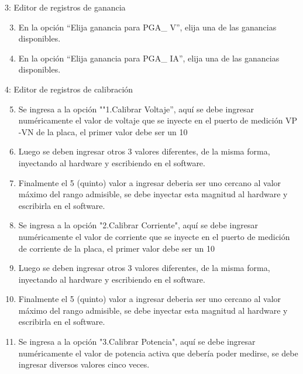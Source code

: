 3: Editor de registros de ganancia
\begin{enumerate}
\setcounter{enumi}{2}
\item En la opción \textquotedblleft Elija ganancia para PGA\_ V\textquotedblright , elija una de las ganancias disponibles.
\item En la opción \textquotedblleft Elija ganancia para PGA\_ IA\textquotedblright , elija una de las ganancias disponibles.
\end{enumerate}


4: Editor de registros de calibración
\begin{enumerate}
\setcounter{enumi}{4}
\item Se ingresa a la opción ""1.Calibrar Voltaje”, aquí se debe ingresar numéricamente el valor de voltaje que se inyecte en el puerto de medición VP -VN de la placa, el primer valor debe ser un 10%
\item Luego se deben ingresar otros 3 valores diferentes, de la misma forma, inyectando al hardware y escribiendo en el software.
\item Finalmente el 5 (quinto) valor a ingresar deberia ser uno cercano al valor máximo del rango admisible, se debe inyectar esta magnitud al hardware y escribirla en el software.
\item Se ingresa a la opción "2.Calibrar Corriente", aquí se debe ingresar numéricamente el valor de corriente que se inyecte en el puerto de medición de corriente de la placa, el primer valor debe ser un 10%
\item Luego se deben ingresar otros 3 valores diferentes, de la misma forma, inyectando al hardware y escribiendo en el software.
\item Finalmente el 5 (quinto) valor a ingresar deberia ser uno cercano al valor máximo del rango admisible, se debe inyectar esta magnitud al hardware y escribirla en el software.
\item Se ingresa a la opción "3.Calibrar Potencia", aquí se debe ingresar numéricamente el valor de potencia activa que debería poder medirse, se debe ingresar diversos valores cinco veces.
\end{enumerate}


